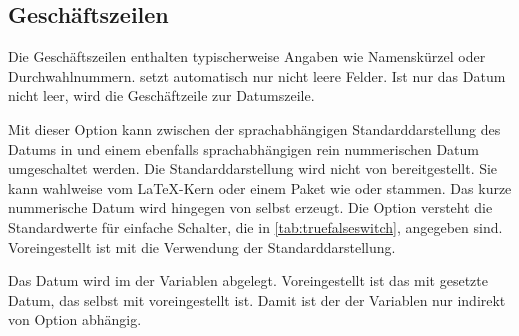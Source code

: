 \subsection{Geschäftszeilen}
%
\BeginIndexGroup
{}%

\iftrue %
Die Geschäftszeilen enthalten typischerweise Angaben wie Namenskürzel oder
Durchwahlnummern. \KOMAScript{} setzt automatisch nur nicht leere Felder. Ist
nur das Datum nicht leer, wird die Geschäftzeile zur Datumszeile.
\else%
Die Geschäftszeile kann auch länger als eine Zeile sein. Sie wird nur gesetzt,
wenn mindestens eine der Variablen für die Geschäftszeile nicht leer ist.  Es
werden nur nicht leere Felder gesetzt. Um\textnote{Tipp!} ein scheinbar leeres
Feld zu setzen, kann man einen scheinbar leeren Variableninhalt wie
\Macro{mbox}\Parameter{} verwenden. Wird auf die Geschäftszeile verzichtet, so
werden an ihrer Stelle Bezeichnung und Inhalt der Variablen
\DescRef{\LabelBase.variable.date} ausgegeben. %
\iffalse%
Informationen, wie Variablen zur Geschäftszeile hinzugefügt oder entfernt
werden, sind in \autoref{sec:scrlttr2-experts.variables},
\DescPageRef{scrlttr2-experts.cmd.removereffields} zu finden.%
\fi%
\fi

\begin{Declaration}
\end{Declaration}
Mit dieser Option kann zwischen der sprachabhängigen Standarddarstellung des
Datums in
 und einem
ebenfalls sprachabhängigen rein nummerischen Datum umgeschaltet werden. Die
Standarddarstellung wird nicht von \KOMAScript{} bereitgestellt. Sie kann
wahlweise vom \LaTeX-Kern oder einem Paket wie
 oder
stammen. Das kurze nummerische
Datum wird hingegen von  selbst erzeugt. Die Option versteht
die Standardwerte für einfache Schalter, die in \autoref{tab:truefalseswitch},
 angegeben
sind. Voreingestellt ist mit  die
Verwendung der Standarddarstellung.

\begin{Declaration}
\end{Declaration}
Das Datum \iffalse %
in der gewählten Darstellung %
\fi %
wird im  der Variablen 
abgelegt. Voreingestellt ist das mit
 gesetzte Datum, das selbst mit
voreingestellt ist. Damit ist der  der Variablen nur indirekt
von Option %
 abhängig.

